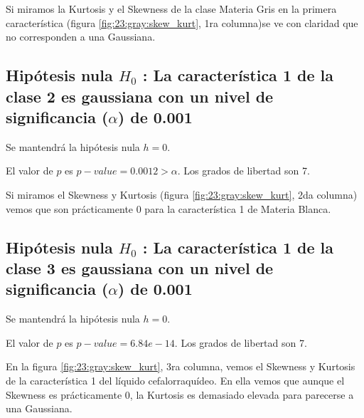 \documentclass[11pt]{article} %
\begin{document}
Si miramos la Kurtosis y el Skewness de la clase Materia Gris en la primera característica (figura \ref{fig:23:gray:skew_kurt}, 1ra columna)se ve con claridad que no corresponden a una Gaussiana.

\subsection[2do caso]{Hipótesis nula $H_0$ : La característica 1 de la clase 2 es gaussiana con un nivel de significancia ($\alpha$) de 0.001}

Se mantendrá la hipótesis nula $h = 0$.

El valor de $p$ es $p-value = 0.0012 > \alpha$. Los grados de libertad son 7. 

Si miramos el Skewness y Kurtosis (figura \ref{fig:23:gray:skew_kurt}, 2da columna) vemos que son prácticamente 0 para la característica 1 de Materia Blanca.

\subsection[3er caso]{Hipótesis nula $H_0$ : La característica 1 de la clase 3 es gaussiana con un nivel de significancia ($\alpha$) de 0.001}

Se mantendrá la hipótesis nula $h = 0$.

El valor de $p$ es $p-value = 6.84e-14$. Los grados de libertad son 7. 

En la figura \ref{fig:23:gray:skew_kurt}, 3ra columna, vemos el Skewness y Kurtosis de la característica 1 del líquido cefalorraquídeo. En ella vemos que aunque el Skewness es prácticamente 0, la Kurtosis es demasiado elevada para parecerse a una Gaussiana.
\end{document}
